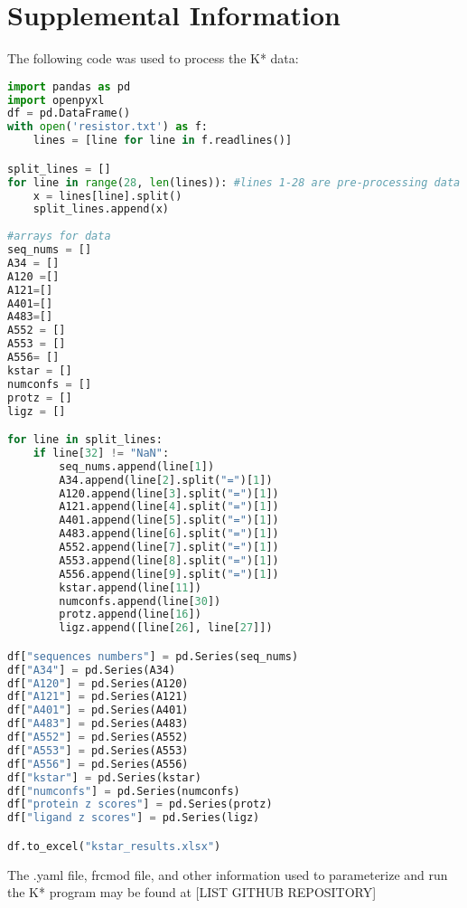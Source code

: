 \documentclass[12pt]{extarticle}
\begin{document}
\section{Supplemental Information}
The following code was used to process the K* data:
\small
\begin{lstlisting}[language=Python]
import pandas as pd
import openpyxl
df = pd.DataFrame()
with open('resistor.txt') as f:
    lines = [line for line in f.readlines()]

split_lines = []
for line in range(28, len(lines)): #lines 1-28 are pre-processing data
    x = lines[line].split()
    split_lines.append(x)
    
#arrays for data
seq_nums = []
A34 = []
A120 =[]
A121=[]
A401=[]
A483=[]
A552 = []
A553 = []
A556= []
kstar = []
numconfs = []
protz = []
ligz = []

for line in split_lines:
    if line[32] != "NaN":
        seq_nums.append(line[1])
        A34.append(line[2].split("=")[1])
        A120.append(line[3].split("=")[1])
        A121.append(line[4].split("=")[1])
        A401.append(line[5].split("=")[1])
        A483.append(line[6].split("=")[1])
        A552.append(line[7].split("=")[1])
        A553.append(line[8].split("=")[1])
        A556.append(line[9].split("=")[1])
        kstar.append(line[11])
        numconfs.append(line[30])
        protz.append(line[16])
        ligz.append([line[26], line[27]])

df["sequences numbers"] = pd.Series(seq_nums)
df["A34"] = pd.Series(A34)
df["A120"] = pd.Series(A120)
df["A121"] = pd.Series(A121)
df["A401"] = pd.Series(A401)
df["A483"] = pd.Series(A483)
df["A552"] = pd.Series(A552)
df["A553"] = pd.Series(A553)
df["A556"] = pd.Series(A556)
df["kstar"] = pd.Series(kstar)
df["numconfs"] = pd.Series(numconfs)
df["protein z scores"] = pd.Series(protz)
df["ligand z scores"] = pd.Series(ligz)

df.to_excel("kstar_results.xlsx")  
\end{lstlisting}
The .yaml file, frcmod file, and other information used to parameterize and run the K* program may be found at [LIST GITHUB REPOSITORY]
\end{document}
